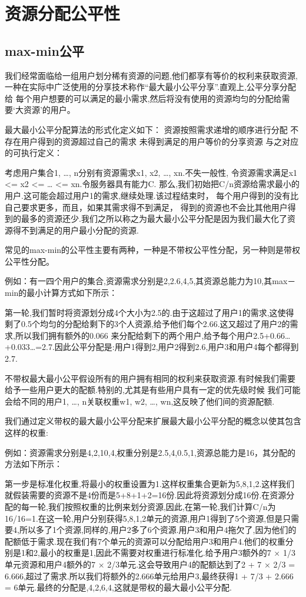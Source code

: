 \section{资源分配公平性}
\subsection{max-min公平}
我们经常面临给一组用户划分稀有资源的问题,他们都享有等价的权利来获取资源,
一种在实际中广泛使用的分享技术称作“最大最小公平分享”.直观上,公平分享分配给
每个用户想要的可以满足的最小需求,然后将没有使用的资源均匀的分配给需要‘大资源’的用户。

最大最小公平分配算法的形式化定义如下：
资源按照需求递增的顺序进行分配
不存在用户得到的资源超过自己的需求
未得到满足的用户等价的分享资源
与之对应的可执行定义：

考虑用户集合1, …, n分别有资源需求x1, x2, …, xn.不失一般性,
令资源需求满足x1 <= x2 <= … <= xn.令服务器具有能力C.
那么,我们初始把C/n资源给需求最小的用户.这可能会超过用户1的需求,继续处理.该过程结束时，
每个用户得到的没有比自己要求更多，而且，如果其需求得不到满足，
得到的资源也不会比其他用户得到的最多的资源还少.我们之所以称之为最大最小公平分配是因为我们最大化了资源得不到满足的用户最小分配的资源.

常见的max-min的公平性主要有两种，一种是不带权公平性分配，另一种则是带权公平性分配。

例如：有一四个用户的集合,资源需求分别是2,2.6,4,5,其资源总能力为10,其max－min的最小计算方式如下所示：

第一轮,我们暂时将资源划分成4个大小为2.5的.由于这超过了用户1的需求,这使得剩了0.5个均匀的分配给剩下的3个人资源,给予他们每个2.66.这又超过了用户2的需求,所以我们拥有额外的0.066
来分配给剩下的两个用户,给予每个用户2.5+0.66…+0.033…=2.7.因此公平分配是:用户1得到2,用户2得到2.6,用户3和用户4每个都得到2.7.

不带权最大最小公平假设所有的用户拥有相同的权利来获取资源.有时候我们需要给予一些用户更大的配额.特别的,尤其是有些用户具有一定的优先级时候
我们可能会给不同的用户1, …, n关联权重w1, w2, …, wn,这反映了他们间的资源配额.

我们通过定义带权的最大最小公平分配来扩展最大最小公平分配的概念以使其包含这样的权重:

例如：资源需求分别是4,2,10,4,权重分别是2.5,4,0.5,1,资源总能力是16，其分配的方法如下所示：

第一步是标准化权重,将最小的权重设置为1.这样权重集合更新为5,8,1,2.这样我们就假装需要的资源不是4份而是5+8+1+2=16份.因此将资源划分成16份.在资源分配的每一轮,我们按照权重的比例来划分资源,因此,在第一轮,我们计算C/n为16/16=1.在这一轮,用户分别获得5,8,1,2单元的资源,用户1得到了5个资源,但是只需要4,所以多了1个资源,同样的,用户2多了6个资源.用户3和用户4拖欠了,因为他们的配额低于需求.现在我们有7个单元的资源可以分配给用户3和用户4.他们的权重分别是1和2,最小的权重是1,因此不需要对权重进行标准化.给予用户3额外的7 × 1/3单元资源和用户4额外的7 × 2/3单元.这会导致用户4的配额达到了2 + 7 × 2/3 = 6.666,超过了需求.所以我们将额外的2.666单元给用户3,最终获得1 + 7/3 + 2.666 = 6单元.最终的分配是,4,2,6,4,这就是带权的最大最小公平分配.
